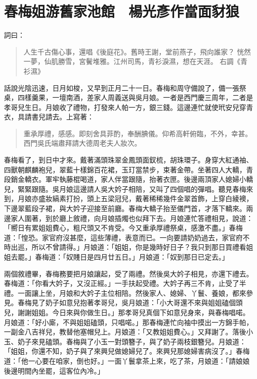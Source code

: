 
\chapter{春梅姐游舊家池館　楊光彥作當面豺狼}

詞曰：
\begin{quote}
人生千古傷心事，還唱《後庭花》。舊時王謝，堂前燕子，飛向誰家？
恍然一夢，仙肌勝雪，宮鬢堆雅。江州司馬，青衫淚濕，想在天涯。
右調《青衫濕》
\end{quote}

話說光陰迅速，日月如梭，又早到正月二十一日。春梅和周守備說了，備一張祭桌，四樣羹果，一壇南酒，差家人周義送與吳月娘。一者是西門慶三周年，二者是孝哥兒生日。月娘收了禮物，打發來人帕一方，銀三錢。這邊連忙就使玳安兒穿青衣，具請書兒請去。上寫著：
\begin{quote}
重承厚禮，感感。即刻舍具菲酌，奉酬腆儀。仰希高軒俯臨，不外，幸甚。西門吳氏端肅拜請大德周老夫人妝次。
\end{quote}

春梅看了，到日中才來。戴著滿頭珠翠金鳳頭面釵梳，胡珠環子。身穿大紅通袖、四獸朝麒麟袍兒，翠藍十樣錦百花裙，玉玎當禁步，束著金帶。坐著四人大轎，青段銷金轎衣。軍牢執藤棍喝道，家人伴當跟隨，抬著衣匣。後邊兩頂家人媳婦小轎兒，緊緊跟隨。吳月娘這邊請人吳大妗子相陪，又叫了四個唱的彈唱。聽見春梅來到，月娘亦盛妝縞素打扮，頭上五梁冠兒，戴著稀稀幾件金翠首飾，上穿白綾襖，下邊翠藍段子裙，與大妗子迎接至前廳。春梅大轎子抬至儀門首，才落下轎來。兩邊家人圍著，到於廳上敘禮，向月娘插燭也似拜下去。月娘連忙答禮相見，說道：「嚮日有累姐姐費心，粗尺頭又不肯受。今又重承厚禮祭桌，感激不盡。」春梅道：「惶恐。家官府沒甚麼，這些薄禮，表意而已。一向要請奶奶過去，家官府不時出巡，所以不曾請得。」月娘道：「姐姐，你是幾時好日子？我只到那日買禮看姐姐去罷。」春梅道：「奴賤日是四月廿五日。」月娘道：「奴到那日已定去。」

兩個敘禮畢，春梅務要把月娘讓起，受了兩禮。然後吳大妗子相見，亦還下禮去。春梅道：「你看大妗子，又沒正經。」一手扶起受禮。大妗子再三不肯，止受了半禮。一面讓上坐，月娘和大妗子主位相陪。然後家人、媳婦、丫鬟、養娘，都來參見。春梅見了奶子如意兒抱著孝哥兒，吳月娘道：「小大哥還不來與姐姐磕個頭兒，謝謝姐姐。今日來與你做生日。」那孝哥兒真個下如意兒身來，與春梅唱喏。月娘道：「好小廝，不與姐姐磕頭，只唱喏。」那春梅連忙向袖中摸出一方錦手帕，一副金八吉祥兒，教替他塞帽兒上。月娘道：「又教姐姐費心。」又拜謝了。落後小玉、奶子來見磕頭。春梅與了小玉一對頭簪子，與了奶子兩枝銀簪兒。月娘道：「姐姐，你還不知，奶子與了來興兒做媳婦兒了。來興兒那媳婦害病沒了。」春梅道：「他一心要在咱家，倒也好。」一面丫鬟拿茶上來，吃了茶，月娘道：「請娘娘後邊明間內坐罷，這客位內冷。」

